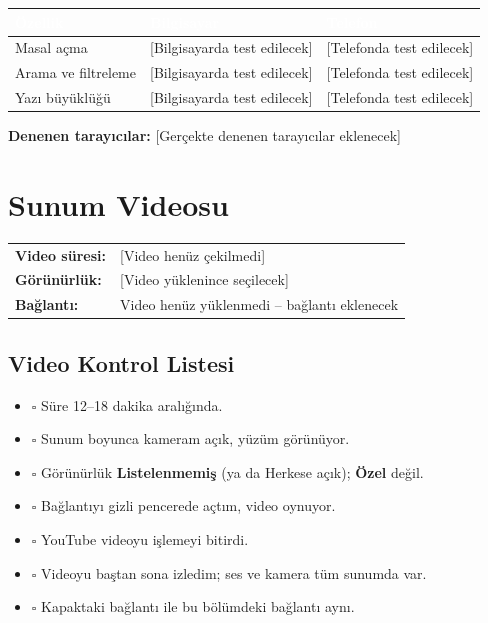 \documentclass[12pt,a4paper]{article}
\newcommand{\youtubelink}{Video henüz yüklenmedi -- bağlantı eklenecek}
\begin{document}
\begin{center}
\begin{tabular}{@{}p{6cm}p{3.4cm}p{3.4cm}@{}}
\toprule
\rowcolor{ana}\textcolor{white}{\textbf{Özellik}} & \textcolor{white}{\textbf{Bilgisayar}} & \textcolor{white}{\textbf{Telefon}} \\
\midrule
Masal açma & [Bilgisayarda test edilecek] & [Telefonda test edilecek] \\
Arama ve filtreleme & [Bilgisayarda test edilecek] & [Telefonda test edilecek] \\
Yazı büyüklüğü & [Bilgisayarda test edilecek] & [Telefonda test edilecek] \\
\bottomrule
\end{tabular}
\end{center}

\textbf{Denenen tarayıcılar:} [Gerçekte denenen tarayıcılar eklenecek]

\section{Sunum Videosu}
\begin{center}
\begin{tabular}{@{}ll@{}}
\textbf{Video süresi:} & [Video henüz çekilmedi] \quad  \\
\textbf{Görünürlük:} & [Video yüklenince seçilecek] \\
\textbf{Bağlantı:} & \youtubelink \\
\end{tabular}
\end{center}

\subsection{Video Kontrol Listesi}

\begin{itemize}
  \item $\square$ Süre 12--18 dakika aralığında.
  \item $\square$ Sunum boyunca kameram açık, yüzüm görünüyor.
  \item $\square$ Görünürlük \textbf{Listelenmemiş} (ya da Herkese açık); \textbf{Özel} değil.
  \item $\square$ Bağlantıyı gizli pencerede açtım, video oynuyor.
  \item $\square$ YouTube videoyu işlemeyi bitirdi.
  \item $\square$ Videoyu baştan sona izledim; ses ve kamera tüm sunumda var.
  \item $\square$ Kapaktaki bağlantı ile bu bölümdeki bağlantı aynı.
\end{itemize}
\end{document}
